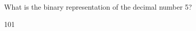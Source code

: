 \question What is the binary representation of the decimal number 5?
\begin{solution}
101
\end{solution}
